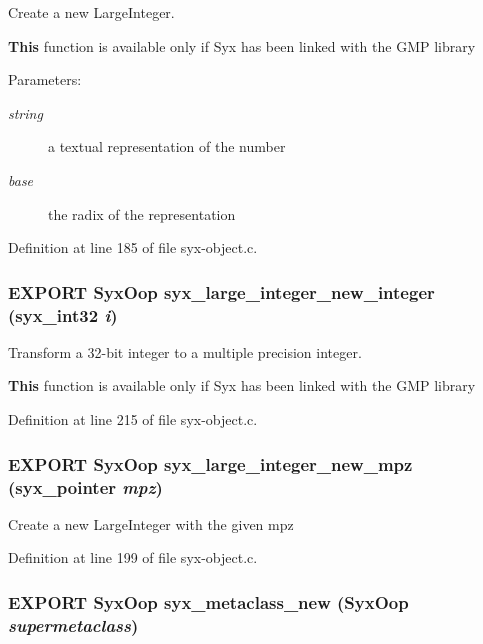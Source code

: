 Create a new LargeInteger.

{\bf This} function is available only if Syx has been linked with the GMP library

\begin{Desc}
\item[Parameters:]
\begin{description}
\item[{\em string}]a textual representation of the number \item[{\em base}]the radix of the representation \end{description}
\end{Desc}


Definition at line 185 of file syx-object.c.\hypertarget{syx-object_8h_72fbd99412e7332f70d9a5a15945a33d}{
\subsubsection{\setlength{\rightskip}{0pt plus 5cm}EXPORT {\bf SyxOop} syx\_\-large\_\-integer\_\-new\_\-integer ({\bf syx\_\-int32} {\em i})}}
\label{syx-object_8h_72fbd99412e7332f70d9a5a15945a33d}


Transform a 32-bit integer to a multiple precision integer.

{\bf This} function is available only if Syx has been linked with the GMP library 

Definition at line 215 of file syx-object.c.\hypertarget{syx-object_8h_68aa419b497b02410024a4fd26cac062}{
\subsubsection{\setlength{\rightskip}{0pt plus 5cm}EXPORT {\bf SyxOop} syx\_\-large\_\-integer\_\-new\_\-mpz ({\bf syx\_\-pointer} {\em mpz})}}
\label{syx-object_8h_68aa419b497b02410024a4fd26cac062}


Create a new LargeInteger with the given mpz 

Definition at line 199 of file syx-object.c.\hypertarget{syx-object_8h_0c0151b9f4207e6e2d38c4eba9370d9d}{
\subsubsection{\setlength{\rightskip}{0pt plus 5cm}EXPORT {\bf SyxOop} syx\_\-metaclass\_\-new ({\bf SyxOop} {\em supermetaclass})}}
\label{syx-object_8h_0c0151b9f4207e6e2d38c4eba9370d9d}


